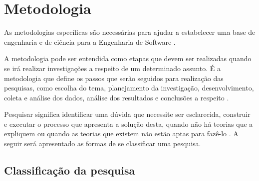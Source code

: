 \chapter{Metodologia}

As metodologias específicas são necessárias para ajudar a estabelecer uma base de engenharia e de ciência para a Engenharia de Software \cite{Wohlin:2000}.

A metodologia pode ser entendida como etapas que devem ser realizadas quando se irá realizar investigações a respeito de um determinado assunto. É a metodologia que define os passos que serão seguidos para realização das pesquisas, como escolha do tema, planejamento da investigação, desenvolvimento, coleta e análise dos dados, análise dos resultados e conclusões a respeito \cite{Moresi:2003}.

Pesquisar significa identificar uma dúvida que necessite ser esclarecida, construir e executar o processo que apresenta a solução desta, quando não há teorias que a expliquem ou quando as teorias que existem não estão aptas para fazê-lo \cite{Koche:1997}. A seguir será apresentado as formas de se classificar uma pesquisa.

\section{Classificação da pesquisa}


